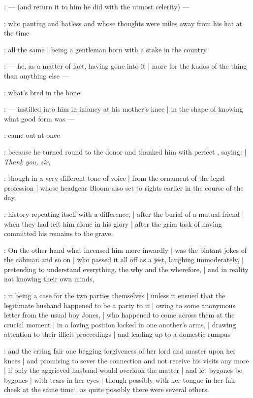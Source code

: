 :
    --- (and return it to him he did with the utmost celerity) ---

:
who panting and hatless
and whose thoughts were miles away from his hat at the time 

:
all the same |
being a gentleman born with a stake in the country 

:
    --- he, as a matter of fact, having gone into it |
        more for the kudos of the thing than anything else ---

:
what's bred in the bone

:
    --- instilled into him in infancy at his mother's knee |
        in the shape of knowing what good form was ---

:
came out at once

:
because he turned round to the donor
and thanked him with perfect , saying: |
\emph{Thank you, sir},

:
though in a very different tone of voice |
from the ornament of the legal profession |
whose headgear Bloom also set to rights earlier in the course of the day,

:
history repeating itself with a difference, |
after the burial of a mutual friend |
when they had left him alone in his glory |
after the grim task of having committed his remains to the grave.

:
On the other hand what incensed him more inwardly |
was the blatant jokes of the cabman and so on |
who passed it all off as a jest, laughing immoderately, |
pretending to understand everything, the why and the wherefore, |
and in reality not knowing their own minds,

:
it being a case for the two parties themselves |
unless it ensued that the legitimate husband happened to be a party to it |
owing to some anonymous letter from the usual boy Jones, |
who happened to come across them at the crucial moment |
in a loving position locked in one another's arms, |
drawing attention to their illicit proceedings |
and leading up to a domestic rumpus

:
and the erring fair one begging forgiveness of her lord and master upon her knees |
and promising to sever the connection and not receive his visits any more |
if only the aggrieved husband would overlook the matter |
and let bygones be bygones |
with tears in her eyes |
though possibly with her tongue in her fair cheek at the same time |
as quite possibly there were several others.

